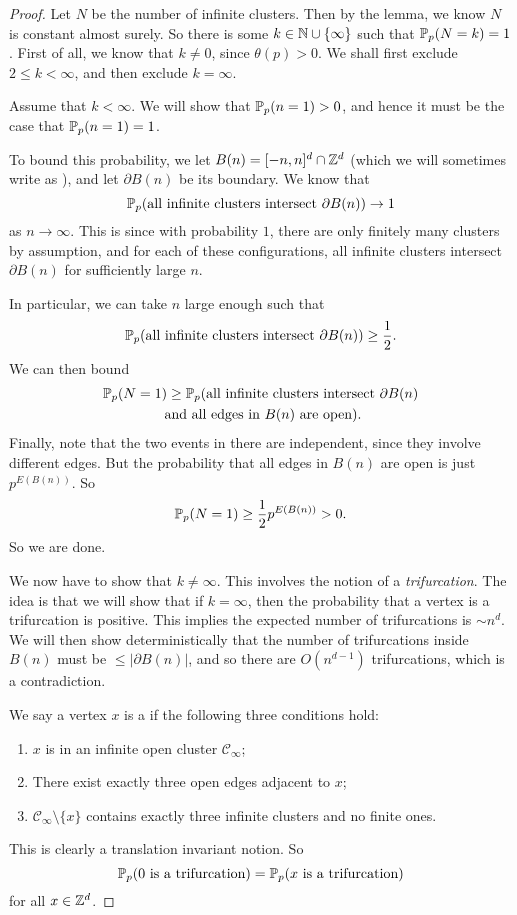 \documentclass[a4paper]{article}
\begin{document}
\begin{proof}
  Let $N$ be the number of infinite clusters. Then by the lemma, we know $N$ is constant almost surely. So there is some $k \in \N \cup \{\infty\}$ such that $\P_p(N = k) = 1$. First of all, we know that $k \not= 0$, since $\theta(p) > 0$. We shall first exclude $2 \leq k < \infty$, and then exclude $k = \infty$.

  Assume that $k < \infty$. We will show that $\P_p(n = 1) > 0$, and hence it must be the case that $\P_p(n = 1) = 1$.

  To bound this probability, we let $B(n) = [-n, n]^d \cap \Z^d$ (which we will sometimes write as ), and let $\partial B(n)$ be its boundary. We know that
  \[
    \P_p(\text{all infinite clusters intersect $\partial B(n)$}) \to 1
  \]
  as $n \to \infty$. This is since with probability $1$, there are only finitely many clusters by assumption, and for each of these configurations, all infinite clusters intersect $\partial B(n)$ for sufficiently large $n$.

  In particular, we can take $n$ large enough such that
  \[
    \P_p(\text{all infinite clusters intersect }\partial B(n)) \geq \frac{1}{2}.
  \]
  We can then bound
  \begin{multline*}
    \P_p(N = 1) \geq \P_p(\text{all infinite clusters intersect }\partial B(n)\\
    \text{ and all edges in $B(n)$ are open}).
  \end{multline*}
  Finally, note that the two events in there are independent, since they involve different edges. But the probability that all edges in $B(n)$ are open is just $p^{E(B(n))}$. So
  \[
    \P_p(N = 1) \geq \frac{1}{2} p^{E(B(n))} > 0.
  \]
  So we are done.

  We now have to show that $k \not= \infty$. This involves the notion of a \emph{trifurcation}. The idea is that we will show that if $k = \infty$, then the probability that a vertex is a trifurcation is positive. This implies the expected number of trifurcations is $\sim n^d$. We will then show deterministically that the number of trifurcations inside $B(n)$ must be $\leq |\partial B(n)|$, and so there are $O(n^{d - 1})$ trifurcations, which is a contradiction.

  We say a vertex $x$ is a  if the following three conditions hold:
  \begin{enumerate}
    \item $x$ is in an infinite open cluster $\mathcal{C}_\infty$;
    \item There exist exactly three open edges adjacent to $x$;
    \item $\mathcal{C}_\infty \setminus \{x\}$ contains exactly three infinite clusters and no finite ones.
  \end{enumerate}
  This is clearly a translation invariant notion. So
  \[
    \P_p(0 \text{ is a trifurcation}) = \P_p(x \text{ is a trifurcation})
  \]
  for all $x \in \Z^d$.


\end{proof}
\end{document}

